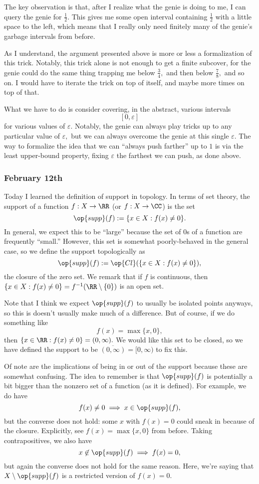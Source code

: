The key observation is that, after I realize what the genie is doing to me, I can query the genie for $\frac12.$ This gives me some open interval containing $\frac12$ with a little space to the left, which means that I really only need finitely many of the genie's garbage intervals from before.

As I understand, the argument presented above is more or less a formalization of this trick. Notably, this trick alone is not enough to get a finite subcover, for the genie could do the same thing trapping me below $\frac34,$ and then below $\frac78,$ and so on. I would have to iterate the trick on top of itself, and maybe more times on top of that.

What we have to do is consider covering, in the abstract, various intervals
\[[0,\varepsilon]\]
for various values of $\varepsilon.$ Notably, the genie can always play tricks up to any particular value of $\varepsilon,$ but we can always overcome the genie at this single $\varepsilon.$ The way to formalize the idea that we can ``always push farther'' up to $1$ is via the least upper-bound property, fixing $\varepsilon$ the farthest we can push, as done above.

\subsubsection{February 12th}
Today I learned the definition of support in topology. In terms of set theory, the support of a function $f:X\to\RR$ (or $f:X\to\CC$) is the set
\[\op{supp}(f):=\{x\in X:f(x)\ne0\}.\]
In general, we expect this to be ``large'' because the set of $0$s of a function are frequently ``small.'' However, this set is somewhat poorly-behaved in the general case, so we define the support topologically as
\[\op{supp}(f):=\op{Cl}(\{x\in X:f(x)\ne0\}),\]
the closure of the zero set. We remark that if $f$ is continuous, then $\{x\in X:f(x)\ne0\}=f^{-1}(\RR\setminus\{0\})$ is an open set.

Note that I think we expect $\op{supp}(f)$ to usually be isolated points anyways, so this is doesn't usually make much of a difference. But of course, if we do something like
\[f(x)=\max\{x,0\},\]
then $\{x\in\RR:f(x)\ne0\}=(0,\infty).$ We would like this set to be closed, so we have defined the support to be $\overline{(0,\infty)}=[0,\infty)$ to fix this.

Of note are the implications of being in or out of the support because these are somewhat confusing. The idea to remember is that $\op{supp}(f)$ is potentially a bit bigger than the nonzero set of a function (as it is defined). For example, we do have
\[f(x)\ne0\implies x\in\op{supp}(f),\]
but the converse does not hold: some $x$ with $f(x)=0$ could sneak in because of the closure. Explicitly, see $f(x)=\max\{x,0\}$ from before. Taking contrapositives, we also have
\[x\not\in\op{supp}(f)\implies f(x)=0,\]
but again the converse does not hold for the same reason. Here, we're saying that $X\setminus\op{supp}(f)$ is a restricted version of $f(x)=0.$

